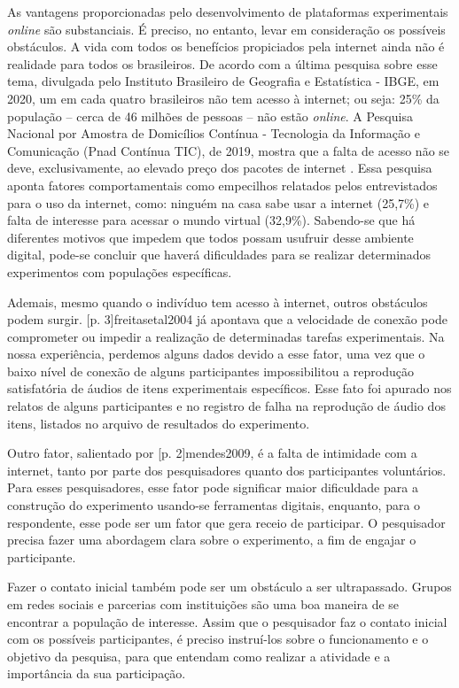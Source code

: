 \documentclass{textolivre}
\begin{document}
As vantagens proporcionadas pelo desenvolvimento de plataformas experimentais \textit{online} são substanciais. É preciso, no entanto, levar em consideração os possíveis obstáculos. A vida com todos os benefícios propiciados pela internet ainda não é realidade para todos os brasileiros. De acordo com a última pesquisa sobre esse tema, divulgada pelo Instituto Brasileiro de Geografia e Estatística - IBGE, em 2020, um em cada quatro brasileiros não tem acesso à internet; ou seja: 25\% da população – cerca de 46 milhões de pessoas – não estão \textit{online}. A Pesquisa Nacional por Amostra de Domicílios Contínua - Tecnologia da Informação e Comunicação (Pnad Contínua TIC), de 2019, mostra que a falta de acesso não se deve, exclusivamente, ao elevado preço dos pacotes de internet \cite{brasilc2021}. Essa pesquisa aponta fatores comportamentais como empecilhos relatados pelos entrevistados para o uso da internet, como: ninguém na casa sabe usar a internet (25,7\%) e falta de interesse para acessar o mundo virtual (32,9\%). Sabendo-se que há diferentes motivos que impedem que todos possam usufruir desse ambiente digital, pode-se concluir que haverá dificuldades para se realizar determinados experimentos com populações específicas.

Ademais, mesmo quando o indivíduo tem acesso à internet, outros obstáculos podem surgir. [p. 3]{freitasetal2004} já apontava que a velocidade de conexão pode comprometer ou impedir a realização de determinadas tarefas experimentais. Na nossa experiência, perdemos alguns dados devido a esse fator, uma vez que o baixo nível de conexão de alguns participantes impossibilitou a reprodução satisfatória de áudios de itens experimentais específicos. Esse fato foi apurado nos relatos de alguns participantes e no registro de falha na reprodução de áudio dos itens, listados no arquivo de resultados do experimento.

Outro fator, salientado por [p. 2]{mendes2009}, é a falta de intimidade com a internet, tanto por parte dos pesquisadores quanto dos participantes voluntários. Para esses pesquisadores, esse fator pode significar maior dificuldade para a construção do experimento usando-se ferramentas digitais, enquanto, para o respondente, esse pode ser um fator que gera receio de participar. O pesquisador precisa fazer uma abordagem clara sobre o experimento, a fim de engajar o participante.

Fazer o contato inicial também pode ser um obstáculo a ser ultrapassado. Grupos em redes sociais e parcerias com instituições são uma boa maneira de se encontrar a população de interesse. Assim que o pesquisador faz o contato inicial com os possíveis participantes, é preciso instruí-los sobre o funcionamento e o objetivo da pesquisa, para que entendam como realizar a atividade e a importância da sua participação.
\end{document}
